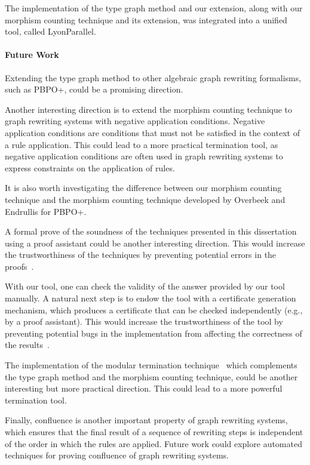 \documentclass{report}
\begin{document}
The implementation of the type graph method and our extension, along with our morphism counting technique and its extension, was integrated into a unified tool, called LyonParallel.
 
\paragraph{Future Work}

Extending the type graph method to other algebraic graph rewriting formalisms, such as PBPO+, could be a promising direction.

Another interesting direction is to extend the morphism counting technique to graph rewriting systems with negative application conditions. Negative application conditions are conditions that must not be satisfied in the context of a rule application. This could lead to a more practical termination tool, as negative application conditions are often used in graph rewriting systems to express constraints on the application of rules.

It is also worth investigating the difference between our morphism counting technique and
 the morphism counting technique developed by Overbeek and Endrullis for PBPO+. 
 
A formal prove of the soundness of the techniques presented in this dissertation using a proof assistant could be another interesting direction. This would increase the trustworthiness of the techniques by preventing potential errors in the proofs~\cite{contejean2004certified}.

With our tool, one can check the validity of the answer provided by our tool manually. A natural next step is to endow the tool with a certificate generation mechanism, which produces a certificate that can be checked independently (e.g., by a proof assistant). This would increase the trustworthiness of the tool by preventing potential bugs in the implementation from affecting the correctness of the results~\cite{contejean2007certification,contejean2010a3pat}.

The implementation of the modular termination technique~\cite{plump2018modular} which complements the type graph method and the morphism counting technique, could be another interesting but more practical direction. This could lead to a more powerful termination tool.
   
Finally, confluence is another important property of graph rewriting systems, which ensures that the final result of a sequence of rewriting steps is independent of the order in which the rules are applied. Future work could explore automated techniques for proving confluence of graph rewriting systems.

\printbibliography
\end{document}
